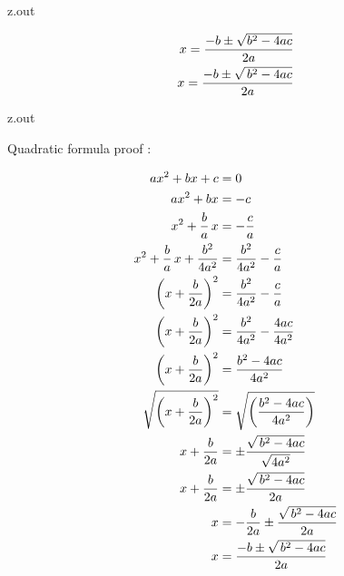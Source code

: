 \MyIO


\begin{VerbatimOut}{z.out}

\begin{align}
  x = \frac{-b \pm \sqrt{b^2-4ac}}{2a}\notag\\
  x = \frac{-b \pm \sqrt{\,b^2-4ac}}{2a}
\end{align}
\end{VerbatimOut}
\index{\verb+\begin{align}+}
\index{\verb+\,+}

\MyIO


\begin{VerbatimOut}{z.out}

Quadratic formula proof
\cite{khan2018}:

\begin{align}
  ax^2 + bx + c &= 0\\
  ax^2 + bx &= -c\notag\\
  x^2 + \frac ba\,x &= -\frac ca\notag\\
  x^2 + \frac ba\,x + \frac{b^2}{4a^2} &= \frac{b^2}{4a^2} - \frac ca\notag\\
  \left(x + \frac b{2a}\right)^2 &= \frac{b^2}{4a^2} - \frac ca\notag\\
  \left(x + \frac b{2a}\right)^2 &= \frac{b^2}{4a^2} - \frac{4ac}{4a^2}\notag\\
  \left(x + \frac b{2a}\right)^2 &= \frac{b^2-4ac}{4a^2}\notag\\
  \sqrt{\left(x + \frac b{2a}\right)^2}
    &= \sqrt{\left(\frac{b^2-4ac}{4a^2}\right)}\notag\\
  x + \frac b{2a} &= \pm \frac{\sqrt{\,b^2-4ac}}{\sqrt{4a^2}}\notag\\
  x + \frac b{2a} &= \pm \frac{\sqrt{\,b^2-4ac}}{2a}\notag\\
  x &= - \frac b{2a} \pm \frac{\sqrt{\,b^2-4ac}}{2a}\notag\\
  x &= \frac{-b \pm \sqrt{\,b^2-4ac}}{2a}
\end{align}
\end{VerbatimOut}

\MyIO


